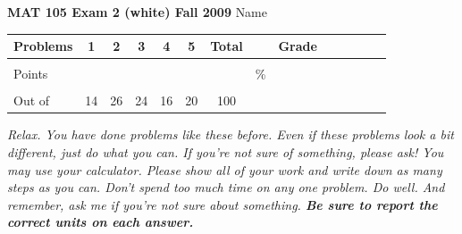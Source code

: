 \documentclass[12pt]{article}
\begin{document}
\textbf{MAT 105 Exam 2 (white) Fall 2009} \hspace{.4in} {\large Name} \hrulefill

\begin{center}

\begin{tabular}
{|l|c|c|c|c|c|c|c|c|c|c|c|c|c|} \hline

 Problems & \hspace{5 pt} 1 \hspace{5 pt}  & \hspace{5 pt} 2 \hspace{5 pt} & \hspace{5 pt} 3  \hspace{5 pt} & \hspace{5 pt} 4  \hspace{5 pt} & \hspace{5 pt}5 \hspace{5 pt} & \hspace{5 pt} Total  \hspace{5 pt} & &  \hspace{5 pt} Grade \hspace{5 pt}  \\ \hline
&&&&&&&&\\  
Points &&&&&&&    \hspace{.8in}\% &  \\ 
&&&&&&&& \\  \hline
Out of & 14 & 26 & 24  & 16 & 20 &100 & & \\ \hline

\end {tabular}

\end{center}

\vspace{.2in}

 \emph{Relax.  You have done problems like these before.  Even if these problems look a bit different, just do what you can.  If you're not sure of something, please ask! You may use your calculator.  Please show all of your work and write down as many steps as you can.  Don't spend too much time on any one problem.  Do well.  And remember, ask me if you're not sure about something. \textbf{Be sure to report the correct units on each answer.}}

\hrulefill
\end{document}
